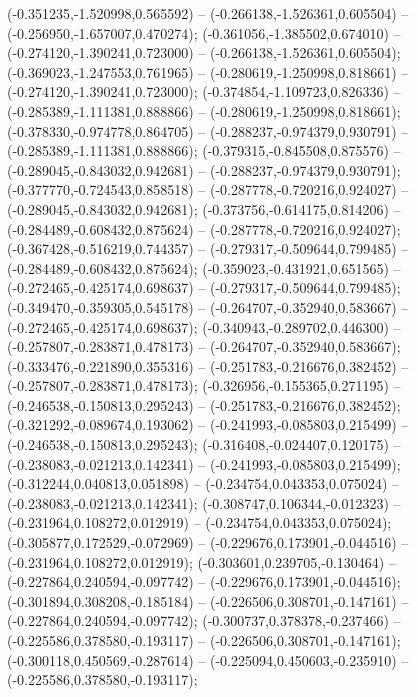  (-0.351235,-1.520998,0.565592) -- (-0.266138,-1.526361,0.605504) -- (-0.256950,-1.657007,0.470274);
 (-0.361056,-1.385502,0.674010) -- (-0.274120,-1.390241,0.723000) -- (-0.266138,-1.526361,0.605504);
 (-0.369023,-1.247553,0.761965) -- (-0.280619,-1.250998,0.818661) -- (-0.274120,-1.390241,0.723000);
 (-0.374854,-1.109723,0.826336) -- (-0.285389,-1.111381,0.888866) -- (-0.280619,-1.250998,0.818661);
 (-0.378330,-0.974778,0.864705) -- (-0.288237,-0.974379,0.930791) -- (-0.285389,-1.111381,0.888866);
 (-0.379315,-0.845508,0.875576) -- (-0.289045,-0.843032,0.942681) -- (-0.288237,-0.974379,0.930791);
 (-0.377770,-0.724543,0.858518) -- (-0.287778,-0.720216,0.924027) -- (-0.289045,-0.843032,0.942681);
 (-0.373756,-0.614175,0.814206) -- (-0.284489,-0.608432,0.875624) -- (-0.287778,-0.720216,0.924027);
 (-0.367428,-0.516219,0.744357) -- (-0.279317,-0.509644,0.799485) -- (-0.284489,-0.608432,0.875624);
 (-0.359023,-0.431921,0.651565) -- (-0.272465,-0.425174,0.698637) -- (-0.279317,-0.509644,0.799485);
 (-0.349470,-0.359305,0.545178) -- (-0.264707,-0.352940,0.583667) -- (-0.272465,-0.425174,0.698637);
 (-0.340943,-0.289702,0.446300) -- (-0.257807,-0.283871,0.478173) -- (-0.264707,-0.352940,0.583667);
 (-0.333476,-0.221890,0.355316) -- (-0.251783,-0.216676,0.382452) -- (-0.257807,-0.283871,0.478173);
 (-0.326956,-0.155365,0.271195) -- (-0.246538,-0.150813,0.295243) -- (-0.251783,-0.216676,0.382452);
 (-0.321292,-0.089674,0.193062) -- (-0.241993,-0.085803,0.215499) -- (-0.246538,-0.150813,0.295243);
 (-0.316408,-0.024407,0.120175) -- (-0.238083,-0.021213,0.142341) -- (-0.241993,-0.085803,0.215499);
 (-0.312244,0.040813,0.051898) -- (-0.234754,0.043353,0.075024) -- (-0.238083,-0.021213,0.142341);
 (-0.308747,0.106344,-0.012323) -- (-0.231964,0.108272,0.012919) -- (-0.234754,0.043353,0.075024);
 (-0.305877,0.172529,-0.072969) -- (-0.229676,0.173901,-0.044516) -- (-0.231964,0.108272,0.012919);
 (-0.303601,0.239705,-0.130464) -- (-0.227864,0.240594,-0.097742) -- (-0.229676,0.173901,-0.044516);
 (-0.301894,0.308208,-0.185184) -- (-0.226506,0.308701,-0.147161) -- (-0.227864,0.240594,-0.097742);
 (-0.300737,0.378378,-0.237466) -- (-0.225586,0.378580,-0.193117) -- (-0.226506,0.308701,-0.147161);
 (-0.300118,0.450569,-0.287614) -- (-0.225094,0.450603,-0.235910) -- (-0.225586,0.378580,-0.193117);
